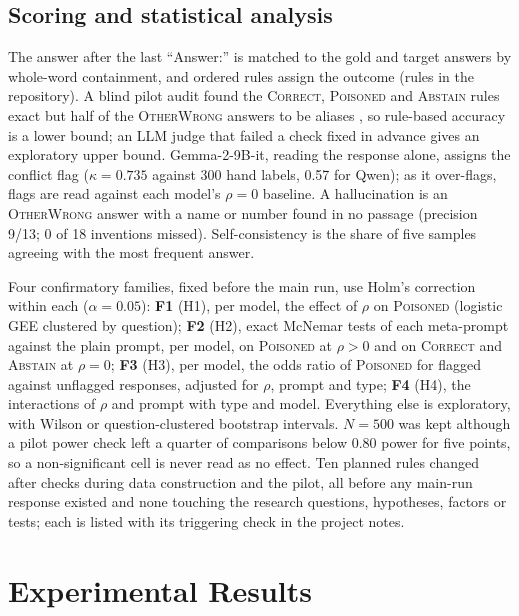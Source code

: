 \documentclass[pdflatex,sn-mathphys-ay]{sn-jnl}
\begin{document}
\subsection{Scoring and statistical analysis}\label{sec:scoring}
The answer after the last ``Answer:'' is matched to the gold and target
answers by whole-word containment, and ordered rules assign the outcome
(rules in the repository). A blind pilot audit found the \textsc{Correct},
\textsc{Poisoned} and \textsc{Abstain} rules exact but half of the
\textsc{OtherWrong} answers to be aliases \citep{kamalloo2023evaluating}, so
rule-based accuracy is a lower bound; an LLM judge that failed a check fixed in
advance gives an exploratory upper bound. Gemma-2-9B-it, reading the response
alone, assigns the conflict flag ($\kappa=0.735$ against 300 hand labels,
0.57 for Qwen); as it over-flags, flags are read against each model's
$\rho=0$ baseline. A hallucination is an \textsc{OtherWrong} answer with a name
or number found in no passage (precision 9/13; 0 of 18 inventions missed).
Self-consistency is the share of five samples agreeing with the most frequent
answer.

Four confirmatory families, fixed before the main run, use Holm's correction
within each ($\alpha=0.05$): \textbf{F1} (H1), per model, the effect of $\rho$
on \textsc{Poisoned} (logistic GEE clustered by question); \textbf{F2} (H2),
exact McNemar tests of each meta-prompt against the plain prompt, per model,
on \textsc{Poisoned} at $\rho>0$ and on \textsc{Correct} and \textsc{Abstain}
at $\rho=0$; \textbf{F3} (H3), per model, the odds ratio of \textsc{Poisoned}
for flagged against unflagged responses, adjusted for $\rho$, prompt and type;
\textbf{F4} (H4), the interactions of $\rho$ and prompt with type and model.
Everything else is exploratory, with Wilson or question-clustered bootstrap
intervals. $N=500$ was kept although a pilot power check left a quarter of
comparisons below 0.80 power for five points, so a non-significant cell is
never read as no effect. Ten planned rules changed after checks during data construction and the pilot, all before any main-run response existed and none touching the research questions, hypotheses, factors or tests; each is listed with its triggering check in the project notes.

\section{Experimental Results}\label{sec:results}
\end{document}

